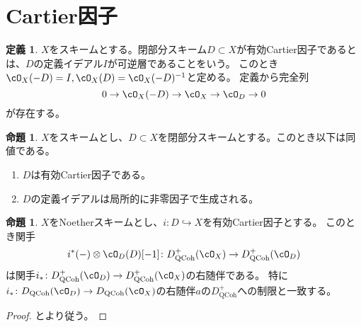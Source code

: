 \documentclass[uplatex, a4paper, dvipdfmx]{jsarticle}
\theoremstyle{definition}
\newtheorem{definition}[theorem]{定義}
\newtheorem{proposition}[theorem]{命題}
\DeclareMathOperator{\QCoh}{\mathrm{QCoh}}
\begin{document}
\section{Cartier因子}
\begin{definition}
    $X$をスキームとする。閉部分スキーム$D \subset X$が有効Cartier因子であるとは、$D$の定義イデアル$I$が可逆層であることをいう。
    このとき$\cO_X(-D) = I, \cO_X(D) = \cO_X(-D)^{-1}$と定める。
    定義から完全列
    \begin{equation}
        0 \to \cO_X(-D) \to \cO_X \to \cO_D \to 0
    \end{equation}
    が存在する。

\end{definition}
\begin{proposition}
    $X$をスキームとし、$D \subset X$を閉部分スキームとする。このとき以下は同値である。
    \begin{enumerate}
        \item $D$は有効Cartier因子である。
        \item $D$の定義イデアルは局所的に非零因子で生成される。
    \end{enumerate}
\end{proposition}
\begin{proposition}
    $X$をNoetherスキームとし、$i \colon D\hookrightarrow X$を有効Cartier因子とする。
    このとき関手
    \begin{equation}
        i^*(-)\otimes \cO_D(D)[-1] \colon D_{\QCoh}^+(\cO_X) \to D_{\QCoh}^+(\cO_D)
    \end{equation}
    は関手$i_* \colon D_{\QCoh}^+(\cO_D) \to D_{\QCoh}^+(\cO_X)$の右随伴である。
    特に$i_* \colon D_{\QCoh}(\cO_D) \to D_{\QCoh}(\cO_X)$の右随伴$a$の$D_{\QCoh}^+$への制限と一致する。
\end{proposition}
\begin{proof}
    {\cite[\href{https://stacks.math.columbia.edu/tag/0a9X}{Tag 0a9X}]{stacks-project}}と{\cite[\href{https://stacks.math.columbia.edu/tag/0AA4}{Tag 0AA4}]{stacks-project}}より従う。
\end{proof}
\end{document}

